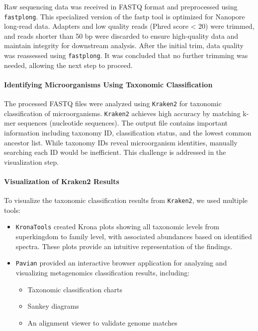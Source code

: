 \documentclass[
]{article}
\providecommand{\tightlist}{%
  \setlength{\itemsep}{0pt}\setlength{\parskip}{0pt}}
\begin{document}
Raw sequencing data was received in FASTQ format and preprocessed using
\texttt{fastplong}. This specialized version of the fastp tool is
optimized for Nanopore long-read data. Adapters and low quality reads
(Phred score \textless{} 20) were trimmed, and reads shorter than 50 bp
were discarded to ensure high-quality data and maintain integrity for
downstream analysis. After the initial trim, data quality was reassessed
using \texttt{fastplong}. It was concluded that no further trimming was
needed, allowing the next step to proceed.

\hypertarget{identifying-microorganisms-using-taxonomic-classification}{%
\paragraph{Identifying Microorganisms Using Taxonomic
Classification}\label{identifying-microorganisms-using-taxonomic-classification}}

The processed FASTQ files were analyzed using \texttt{Kraken2} for
taxonomic classification of microorganisms. \texttt{Kraken2} achieves
high accuracy by matching k-mer sequences (nucleotide sequences). The
output file contains important information including taxonomy ID,
classification status, and the lowest common ancestor list. While
taxonomy IDs reveal microorganism identities, manually searching each ID
would be inefficient. This challenge is addressed in the visualization
step.

\hypertarget{visualization-of-kraken2-results}{%
\paragraph{Visualization of Kraken2
Results}\label{visualization-of-kraken2-results}}

To visualize the taxonomic classification results from \texttt{Kraken2},
we used multiple tools:

\begin{itemize}
\item
  \texttt{KronaTools} created Krona plots showing all taxonomic levels
  from superkingdom to family level, with associated abundances based on
  identified spectra. These plots provide an intuitive representation of
  the findings.
\item
  \texttt{Pavian} provided an interactive browser application for
  analyzing and visualizing metagenomics classification results,
  including:

  \begin{itemize}
  \tightlist
  \item
    Taxonomic classification charts
  \item
    Sankey diagrams
  \item
    An alignment viewer to validate genome matches
  \end{itemize}
\end{itemize}
\end{document}
